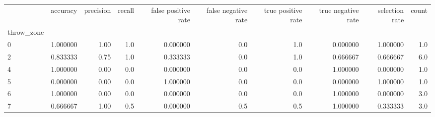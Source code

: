 \begin{tabular}{lrrrrrrrrr}
\toprule
{} &  accuracy &  precision &  recall &  false positive rate &  false negative rate &  true positive rate &  true negative rate &  selection rate &  count \\
throw\_zone &           &            &         &                      &                      &                     &                     &                 &        \\
\midrule
0          &  1.000000 &       1.00 &     1.0 &             0.000000 &                  0.0 &                 1.0 &            0.000000 &        1.000000 &    1.0 \\
2          &  0.833333 &       0.75 &     1.0 &             0.333333 &                  0.0 &                 1.0 &            0.666667 &        0.666667 &    6.0 \\
4          &  1.000000 &       0.00 &     0.0 &             0.000000 &                  0.0 &                 0.0 &            1.000000 &        0.000000 &    1.0 \\
5          &  0.000000 &       0.00 &     0.0 &             1.000000 &                  0.0 &                 0.0 &            0.000000 &        1.000000 &    1.0 \\
6          &  1.000000 &       0.00 &     0.0 &             0.000000 &                  0.0 &                 0.0 &            1.000000 &        0.000000 &    3.0 \\
7          &  0.666667 &       1.00 &     0.5 &             0.000000 &                  0.5 &                 0.5 &            1.000000 &        0.333333 &    3.0 \\
\bottomrule
\end{tabular}
